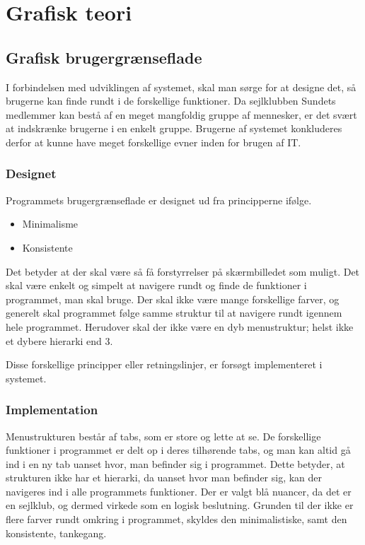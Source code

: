 \chapter{Grafisk teori}
\section{Grafisk brugergrænseflade} \label{chap:GUI}

I forbindelsen med udviklingen af systemet, skal man sørge for at designe det, så brugerne kan finde rundt i de forskellige funktioner. Da sejlklubben Sundets medlemmer kan bestå af en meget mangfoldig gruppe af mennesker, er det svært at indskrænke brugerne i en enkelt gruppe. Brugerne af systemet konkluderes derfor at kunne have meget forskellige evner inden for brugen af IT.

\subsection{Designet} \label{sec:Designet}

Programmets brugergrænseflade er designet ud fra principperne ifølge. \citep{gui1} 

\begin{itemize}
	\item Minimalisme
	\item Konsistente
\end{itemize}

Det betyder at der skal være så få forstyrrelser på skærmbilledet som muligt. Det skal være enkelt og simpelt at navigere rundt og finde de funktioner i programmet, man skal bruge. Der skal ikke være mange forskellige farver, og generelt skal programmet følge samme struktur til at navigere rundt igennem hele programmet. Herudover skal der ikke være en dyb menustruktur; helst ikke et dybere hierarki end 3.

Disse forskellige principper eller retningslinjer, er forsøgt implementeret i systemet.

\subsection{Implementation}\label{sec:Implementation}

Menustrukturen består af tabs, som er store og lette at se. De forskellige funktioner i programmet er delt op i deres tilhørende tabs, og man kan altid gå ind i en ny tab uanset hvor, man befinder sig i programmet. Dette betyder, at strukturen ikke har et hierarki, da uanset hvor man befinder sig, kan der navigeres ind i alle programmets funktioner. Der er valgt blå nuancer, da det er en sejlklub, og dermed virkede som en logisk beslutning. Grunden til der ikke er flere farver rundt omkring i programmet, skyldes den minimalistiske, samt den konsistente, tankegang.

